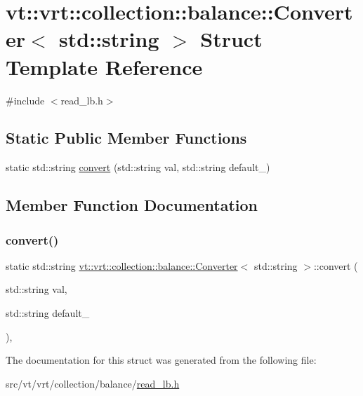 \hypertarget{structvt_1_1vrt_1_1collection_1_1balance_1_1_converter_3_01std_1_1string_01_4}{}\section{vt\+:\+:vrt\+:\+:collection\+:\+:balance\+:\+:Converter$<$ std\+:\+:string $>$ Struct Template Reference}
\label{structvt_1_1vrt_1_1collection_1_1balance_1_1_converter_3_01std_1_1string_01_4}


{\ttfamily \#include $<$read\+\_\+lb.\+h$>$}

\subsection*{Static Public Member Functions}
\begin{DoxyCompactItemize}
\item 
static std\+::string \hyperlink{structvt_1_1vrt_1_1collection_1_1balance_1_1_converter_3_01std_1_1string_01_4_ad43fb755f9c2df3190f9c86b0c74c84b}{convert} (std\+::string val, std\+::string default\+\_\+)
\end{DoxyCompactItemize}


\subsection{Member Function Documentation}
\mbox{\label{structvt_1_1vrt_1_1collection_1_1balance_1_1_converter_3_01std_1_1string_01_4_ad43fb755f9c2df3190f9c86b0c74c84b}} 
\subsubsection{\texorpdfstring{convert()}{convert()}}
{\footnotesize\ttfamily static std\+::string \hyperlink{structvt_1_1vrt_1_1collection_1_1balance_1_1_converter}{vt\+::vrt\+::collection\+::balance\+::\+Converter}$<$ std\+::string $>$\+::convert (\begin{DoxyParamCaption}\item[{std\+::string}]{val,  }\item[{std\+::string}]{default\+\_\+ }\end{DoxyParamCaption})\hspace{0.3cm}{\ttfamily [inline]}, {\ttfamily [static]}}



The documentation for this struct was generated from the following file\+:\begin{DoxyCompactItemize}
\item 
src/vt/vrt/collection/balance/\hyperlink{read__lb_8h}{read\+\_\+lb.\+h}\end{DoxyCompactItemize}
